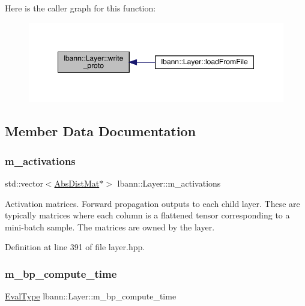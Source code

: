 Here is the caller graph for this function\+:\nopagebreak
\begin{figure}[H]
\begin{center}
\leavevmode
\includegraphics[width=349pt]{classlbann_1_1Layer_ab94eb4ac28bac0c472a1da83ade4adf1_icgraph}
\end{center}
\end{figure}


\subsection{Member Data Documentation}
\mbox{\label{classlbann_1_1Layer_a7caf08e938141d1584e6939cefa4baed}} 
\subsubsection{\texorpdfstring{m\+\_\+activations}{m\_activations}}
{\footnotesize\ttfamily std\+::vector$<$\hyperlink{base_8hpp_a9a697a504ae84010e7439ffec862b470}{Abs\+Dist\+Mat}$\ast$$>$ lbann\+::\+Layer\+::m\+\_\+activations\hspace{0.3cm}{\ttfamily [protected]}}

Activation matrices. Forward propagation outputs to each child layer. These are typically matrices where each column is a flattened tensor corresponding to a mini-\/batch sample. The matrices are owned by the layer. 

Definition at line 391 of file layer.\+hpp.

\mbox{\label{classlbann_1_1Layer_ae28626457a58943b25e7a2920fc271f0}} 
\subsubsection{\texorpdfstring{m\+\_\+bp\+\_\+compute\+\_\+time}{m\_bp\_compute\_time}}
{\footnotesize\ttfamily \hyperlink{base_8hpp_a3266f5ac18504bbadea983c109566867}{Eval\+Type} lbann\+::\+Layer\+::m\+\_\+bp\+\_\+compute\+\_\+time\hspace{0.3cm}{\ttfamily [protected]}}

